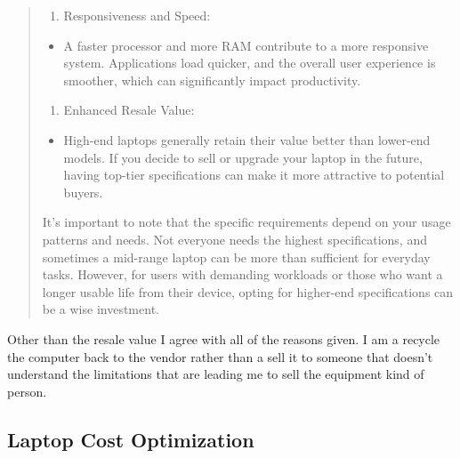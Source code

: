 \documentclass[14pt, letterpaper,twoside]{extreport}
\begin{document}
\begin{quote}
\begin{enumerate}
		\item
		      Responsiveness and Speed:
	\end{enumerate}

	\begin{itemize}

		\item
		      A faster processor and more RAM contribute to a more responsive system. Applications load quicker, and the overall user experience is smoother, which can significantly impact productivity.
	\end{itemize}

	\begin{enumerate}
		\def\labelenumi{\arabic{enumi}.}
		\setcounter{enumi}{7}

		\item
		      Enhanced Resale Value:
	\end{enumerate}

	\begin{itemize}

		\item
		      High-end laptops generally retain their value better than lower-end models. If you decide to sell or upgrade your laptop in the future, having top-tier specifications can make it more attractive to potential buyers.
	\end{itemize}

	It's important to note that the specific requirements depend on your usage patterns and needs. Not everyone needs the highest specifications, and sometimes a mid-range laptop can be more than sufficient for everyday tasks. However, for users with demanding workloads or those who want a longer usable life from their device, opting for higher-end specifications can be a wise investment.
\end{quote}

Other than the resale value I agree with all of the reasons given. I am a recycle the computer back to the vendor rather than a sell it to someone that doesn't understand the limitations that are leading me to sell the equipment kind of person.

\hypertarget{optimizing-cost-with-performance}{%
	\subsection*{Laptop Cost Optimization}\label{optimizing-cost-with-performance}}

\end{document}
